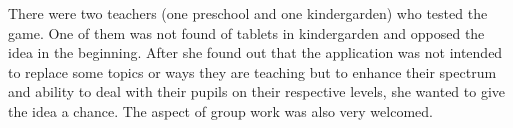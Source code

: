 There were two teachers (one preschool and one kindergarden) who tested the game.
One of them was not found of tablets in kindergarden and opposed the idea in the beginning.
After she found out that the application was not intended to replace some topics or ways they are teaching but
to enhance their spectrum and ability to deal with their pupils on their respective levels,
she wanted to give the idea a chance. The aspect of group work was also very welcomed.
